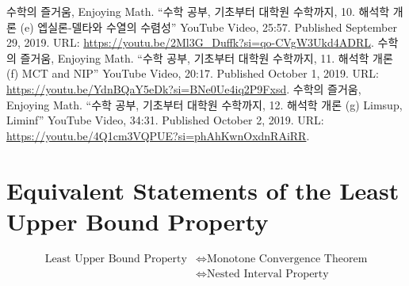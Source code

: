 \documentclass[11pt,openany]{article}
\begin{document}
\vfill

\begin{thebibliography}{9}
	수학의 즐거움, Enjoying Math. ``수학 공부, 기초부터 대학원 수학까지, 10. 해석학 개론 (e) 엡실론-델타와 수열의 수렴성'' YouTube Video, 25:57. Published 
	September 29, 2019. URL: \url{https://youtu.be/2Ml3G_Duffk?si=qo-CVgW3Ukd4ADRL}.
	수학의 즐거움, Enjoying Math. ``수학 공부, 기초부터 대학원 수학까지, 11. 해석학 개론 (f) MCT and NIP'' YouTube Video, 20:17. Published 
	October 1, 2019. URL: \url{https://youtu.be/YdnBQaY5eDk?si=BNe0Ue4iq2P9Fxsd}.
	수학의 즐거움, Enjoying Math. ``수학 공부, 기초부터 대학원 수학까지, 12. 해석학 개론 (g) Limsup, Liminf'' YouTube Video, 34:31. Published 
	October 2, 2019. URL: \url{https://youtu.be/4Q1cm3VQPUE?si=phAhKwnOxdnRAiRR}.
\end{thebibliography}

\newpage
\appendix
\section{Equivalent Statements of the Least Upper Bound Property}
\begin{align*}
\text{Least Upper Bound Property}&\iff\text{Monotone Convergence Theorem}\\
&\iff\text{Nested Interval Property}
\end{align*}
\end{document}
